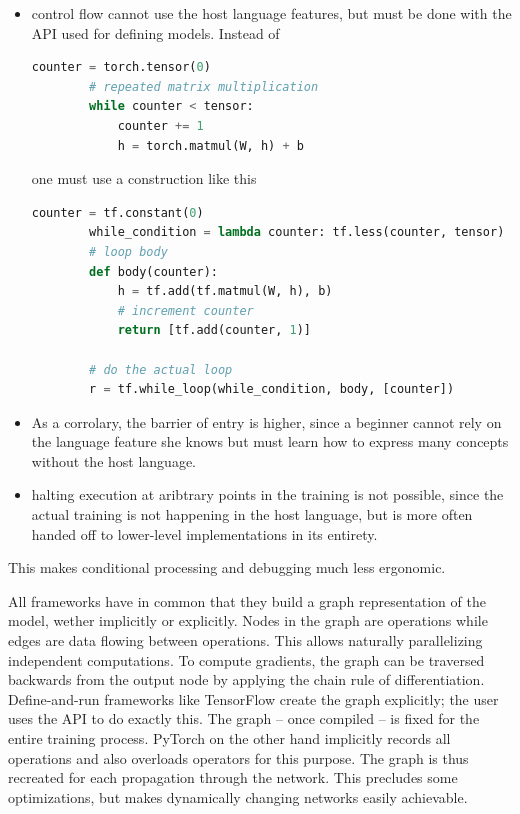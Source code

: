 \begin{itemize}
    \item
        control flow cannot use the host language features, but must be done
        with the API used for defining models. Instead of
        \begin{lstlisting}[language=Python, label=lst:whilepy-pt, gobble=8]
        counter = torch.tensor(0)
        # repeated matrix multiplication
        while counter < tensor:
            counter += 1
            h = torch.matmul(W, h) + b
        \end{lstlisting}

        one must use a construction like this
        \begin{lstlisting}[language=Python, label=lst:whilepy-tf, gobble=8]
        counter = tf.constant(0)
        while_condition = lambda counter: tf.less(counter, tensor)
        # loop body
        def body(counter):
            h = tf.add(tf.matmul(W, h), b)
            # increment counter
            return [tf.add(counter, 1)]

        # do the actual loop
        r = tf.while_loop(while_condition, body, [counter])
        \end{lstlisting}
    \item
        As a corrolary, the barrier of entry is higher, since a beginner cannot rely on the
        language feature she knows but must learn how to express many concepts
        without the host language.
    \item
        halting execution at aribtrary points in the training is not possible,
        since the actual training is not happening in the host language, but
        is more often handed off to lower-level implementations in its
        entirety.
\end{itemize}

This makes conditional processing and debugging much less ergonomic.

All frameworks have in common that they build a graph representation of
the model, wether implicitly or explicitly. Nodes in the graph are
operations while edges are data flowing between operations. This allows
naturally parallelizing independent computations. To compute gradients,
the graph can be traversed backwards from the output node by applying
the chain rule of differentiation. Define-and-run frameworks like
TensorFlow create the graph explicitly; the user uses the API to do
exactly this. The graph -- once compiled -- is fixed for the entire
training process. PyTorch on the other hand implicitly records all
operations and also overloads operators for this purpose. The graph is
thus recreated for each propagation through the network. This precludes
some optimizations, but makes dynamically changing networks easily
achievable.

